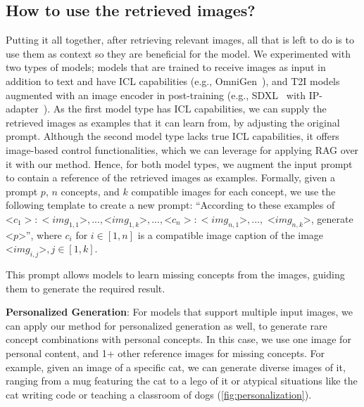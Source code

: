 \vspace{-3pt}
\subsection{How to use the retrieved images?}
Putting it all together, after retrieving relevant images, all that is left to do is to use them as context so they are beneficial for the model.
We experimented with two types of models; models that are trained to receive images as input in addition to text and have ICL capabilities (e.g., OmniGen~\cite{xiao2024omnigen}), and T2I models augmented with an image encoder in post-training (e.g., SDXL~\cite{podellsdxl} with IP-adapter~\cite{ye2023ip}).
As the first model type has ICL capabilities, we can supply the retrieved images as examples that it can learn from, by adjusting the original prompt.
Although the second model type lacks true ICL capabilities, it offers image-based control functionalities, which we can leverage for applying RAG over it with our method.
Hence, for both model types, we augment the input prompt to contain a reference of the retrieved images as examples.
Formally, given a prompt $p$, $n$ concepts, and $k$ compatible images for each concept, we use the following template to create a new prompt:
``According to these examples of 
$\mathord{<}c_1\mathord{>:<}img_{1,1}\mathord{>}, ... , \mathord{<}img_{1,k}\mathord{>}, ... , \mathord{<}c_n\mathord{>:<}img_{n,1}\mathord{>}, ... , $
$\mathord{<}img_{n,k}\mathord{>}$,
generate $\mathord{<}p\mathord{>}$'', 
where $c_i$ for $i\in{[1,n]}$ is a compatible image caption of the image $\mathord{<}img_{i,j}\mathord{>},  j\in{[1,k]}$. 

This prompt allows models to learn missing concepts from the images, guiding them to generate the required result. 

\textbf{Personalized Generation}: 
For models that support multiple input images, we can apply our method for personalized generation as well, to generate rare concept combinations with personal concepts. In this case, we use one image for personal content, and 1+ other reference images for missing concepts. For example, given an image of a specific cat, we can generate diverse images of it, ranging from a mug featuring the cat to a lego of it or atypical situations like the cat writing code or teaching a classroom of dogs (\cref{fig:personalization}).
